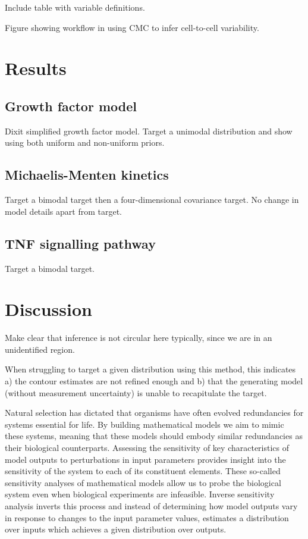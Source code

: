 \documentclass[10pt,letterpaper]{article}
\begin{document}
Include table with variable definitions.

Figure showing workflow in using CMC to infer cell-to-cell variability.


\section{Results}\label{sec:results}

\subsection{Growth factor model}
Dixit simplified growth factor model. Target a unimodal distribution and show using both uniform and non-uniform priors.

\subsection{Michaelis-Menten kinetics}
Target a bimodal target then a four-dimensional covariance target. No change in model details apart from target.

\subsection{TNF signalling pathway}
Target a bimodal target.


\section{Discussion}
\label{sec:discussion}

Make clear that inference is not circular here typically, since we are in an unidentified region.

When struggling to target a given distribution using this method, this indicates a) the contour estimates are not refined enough and b) that the generating model (without measurement uncertainty) is unable to recapitulate the target.

Natural selection has dictated that organisms have often evolved redundancies for systems essential for life. By building mathematical models we aim to mimic these systems, meaning that these models should embody similar redundancies as their biological counterparts. Assessing the sensitivity of key characteristics of model outputs to perturbations in input parameters provides insight into the sensitivity of the system to each of its constituent elements. These so-called sensitivity analyses of mathematical models allow us to probe the biological system even when biological experiments are infeasible. Inverse sensitivity analysis inverts this process and instead of determining how model outputs vary in response to changes to the input parameter values, estimates a distribution over inputs which achieves a given distribution over outputs.
\end{document}
